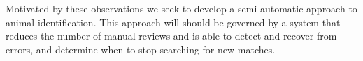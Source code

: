         Motivated by these observations we seek to develop a semi-automatic approach to animal identification.
        This approach will should be governed by a system that reduces the number of manual reviews and is able
          to detect and recover from errors, and determine when to stop searching for new matches.



              
        \RankFigure{}

